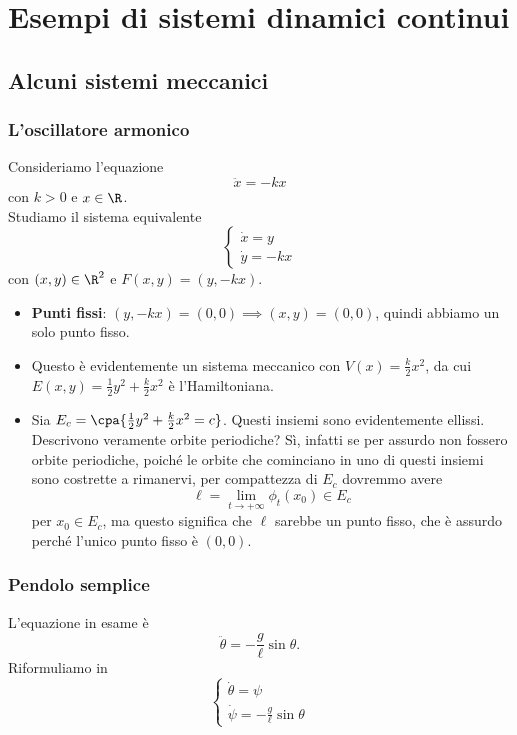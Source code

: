 \chapter{Esempi di sistemi dinamici continui}

\section{Alcuni sistemi meccanici}
\subsection{L'oscillatore armonico}
Consideriamo l'equazione
\[\ddot x=-kx\]
con $k>0$ e $x\in \R$.\\
Studiamo il sistema equivalente
\[\begin{cases}
\dot x=y\\
\dot y=-kx
\end{cases}\]
con $(x,y)\in\R^2$ e $F(x,y)=(y,-kx)$.

\begin{itemize}
\item \textbf{Punti fissi}: $(y,-kx)=(0,0)\implies (x,y)=(0,0)$, quindi abbiamo un solo punto fisso.
\item Questo \`e evidentemente un sistema meccanico con $V(x)=\frac k2 x^2$, da cui $E(x,y)=\frac12 y^2+\frac k2 x^2$ \`e l'Hamiltoniana.
\item Sia $E_c=\cpa{\frac12y^2+\frac k2x^2=c}$. Questi insiemi sono evidentemente ellissi. Descrivono veramente orbite periodiche? S\`i, infatti se per assurdo non fossero orbite periodiche, poich\'e le orbite che cominciano in uno di questi insiemi sono costrette a rimanervi, per compattezza di $E_c$ dovremmo avere 
\[\ell=\lim_{t\to+\infty}\phi_t(x_0)\in E_c\] 
per $x_0\in E_c$, ma questo significa che $\ell$ sarebbe un punto fisso, che \`e assurdo perch\'e l'unico punto fisso \`e $(0,0)$.
\end{itemize}

\subsection{Pendolo semplice}
L'equazione in esame \`e
\[\ddot \theta=-\frac g\ell\sin\theta.\]
Riformuliamo in
\[\begin{cases}
\dot\theta=\psi\\
\dot\psi=-\frac g\ell\sin\theta
\end{cases}\]

